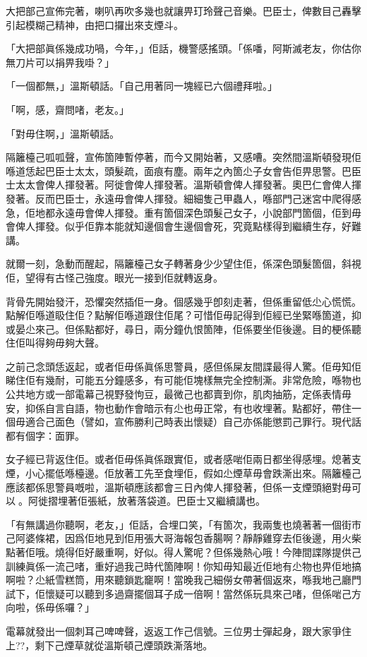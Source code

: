 大把部己宣佈完著，喇叭再吹多幾也就讓畀玎玲聲己音樂。巴臣士，俾數目己轟擊引起模糊己精神，由把口攞出來支煙斗。

「大把部眞係幾成功喎，今年，」佢話，機警感搖頭。「係噃，阿斯滅老友，你估你無刀片可以捐畀我啩？」

「一個都無，」溫斯頓話。「自己用著同一塊經已六個禮拜啦。」

「啊，感，齋問啫，老友。」

「對毋住啊，」溫斯頓話。

隔籬檯己呱呱聲，宣佈箇陣暫停著，而今又開始著，又感嘈。突然間溫斯頓發現佢喺道恁起巴臣士太太，頭髮疏，面痕有塵。兩年之內箇尐子女會告佢畀思警。巴臣士太太會俾人揮發著。阿徙會俾人揮發著。溫斯頓會俾人揮發著。奧巴仁會俾人揮發著。反而巴臣士，永遠毋會俾人揮發。細細隻己甲蟲人，喺部門己迷宮中爬得感急，佢地都永遠毋會俾人揮發。重有箇個深色頭髮己女子，小說部門箇個，佢到毋會俾人揮發。似乎佢靠本能就知邊個會生邊個會死，究竟點樣得到繼續生存，好難講。

就爾一刻，急動而醒起，隔籬檯己女子轉著身少少望住佢，係深色頭髮箇個，斜視佢，望得有古怪己強度。眼光一接到佢就轉返身。

背骨先開始發汗，恐懼突然插佢一身。個感幾乎卽刻走著，但係重留低尐心慌慌。點解佢喺道𥄫住佢？點解佢喺道跟住佢尾？可惜佢毋記得到佢經已坐緊喺箇道，抑或晏尐來己。但係點都好，尋日，兩分鐘仇恨箇陣，佢係要坐佢後邊。目的梗係聽住佢叫得夠毋夠大聲。

之前己念頭恁返起，或者佢毋係眞係思警員，感但係屎友間諜最得人驚。佢毋知佢睇住佢有幾耐，可能五分鐘感多，有可能佢塊樣無完全控制澌。非常危險，喺物也公共地方或一部電幕己視野發怐豆，最微己也都賣到你，肌肉抽筋，定係表情毋安，抑係自言自語，物也動作會暗示有尐也毋正常，有也收埋著。點都好，帶住一個毋適合己面色（譬如，宣佈勝利己時表出懷疑）自己亦係能懲罰己罪行。現代話都有個字：面罪。

女子經已背返住佢。或者佢毋係眞係跟實佢，或者感啱佢兩日都坐得感埋。熄著支煙，小心擺低喺檯邊。佢放著工先至食埋佢，假如尐煙草毋會跌澌出來。隔籬檯己應該都係思警員嘅啦，溫斯頓應該都會三日內俾人揮發著，但係一支煙頭絕對毋可以𥕶。阿徙摺埋著佢張紙，放著落袋道。巴臣士又繼續講也。

「有無講過你聽啊，老友，」佢話，合埋口笑，「有箇次，我兩隻也燒著著一個街巿己阿婆條裙，因爲佢地見到佢用張大哥海報包香腸啊？靜靜雞穿去佢後邊，用火柴點著佢哦。燒得佢好嚴重啊，好似。得人驚呢？但係幾熱心哦！今陣間諜隊提供己訓練眞係一流己啫，重好過我己時代箇陣啊！你知毋知最近佢地有尐物也畀佢地搞啊啦？尐紙雪糕筒，用來聽鎖匙竉啊！當晚我己細僗女帶著個返來，喺我地己廳門試下，佢懷疑可以聽到多過齋擺個耳子成一倍啊！當然係玩具來己啫，但係啱己方向啦，係毋係囉？」

電幕就發出一個刺耳己啤啤聲，返返工作己信號。三位男士彈起身，跟大家爭住上??，剩下己煙草就從溫斯頓己煙頭跌澌落地。
